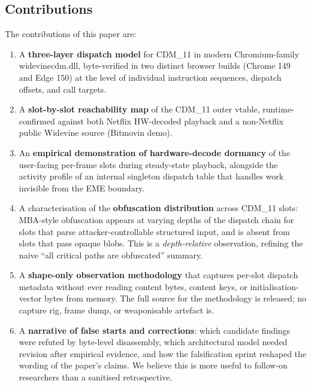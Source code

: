 \documentclass[11pt,letterpaper]{article}
\begin{document}
\subsection*{Contributions}

The contributions of this paper are:

\begin{enumerate}[itemsep=2pt,topsep=2pt]
  \item A \textbf{three-layer dispatch model} for CDM\_11 in modern
        Chromium-family widevinecdm.dll, byte-verified in two distinct
        browser builds (Chrome 149 and Edge 150) at the level of
        individual instruction sequences, dispatch offsets, and call
        targets.
  \item A \textbf{slot-by-slot reachability map} of the CDM\_11 outer
        vtable, runtime-confirmed against both Netflix HW-decoded
        playback and a non-Netflix public Widevine source (Bitmovin
        demo).
  \item An \textbf{empirical demonstration of hardware-decode
        dormancy} of the user-facing per-frame slots during
        steady-state playback, alongside the activity profile of an
        internal singleton dispatch table that handles work invisible
        from the EME boundary.
  \item A characterisation of the \textbf{obfuscation distribution}
        across CDM\_11 slots: MBA-style obfuscation appears at varying
        depths of the dispatch chain for slots that parse
        attacker-controllable structured input, and is absent from
        slots that pass opaque blobs. This is a \emph{depth-relative}
        observation, refining the naive ``all critical paths are
        obfuscated'' summary.
  \item A \textbf{shape-only observation methodology} that captures
        per-slot dispatch metadata without ever reading content
        bytes, content keys, or initialisation-vector bytes from
        memory. The full source for the methodology is released; no
        capture rig, frame dump, or weaponisable artefact is.
  \item A \textbf{narrative of false starts and corrections}: which
        candidate findings were refuted by byte-level disassembly,
        which architectural model needed revision after empirical
        evidence, and how the falsification sprint reshaped the
        wording of the paper's claims. We believe this is more
        useful to follow-on researchers than a sanitised
        retrospective.
\end{enumerate}
\end{document}
